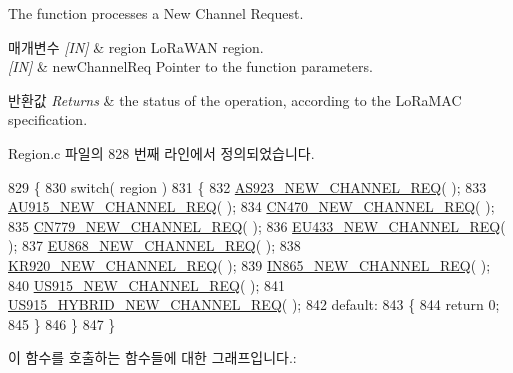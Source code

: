 The function processes a New Channel Request. 


\begin{DoxyParams}{매개변수}
{\em \mbox{[}\+I\+N\mbox{]}} & region Lo\+Ra\+W\+AN region.\\
\hline
{\em \mbox{[}\+I\+N\mbox{]}} & new\+Channel\+Req Pointer to the function parameters.\\
\hline
\end{DoxyParams}

\begin{DoxyRetVals}{반환값}
{\em Returns} & the status of the operation, according to the Lo\+Ra\+M\+AC specification. \\
\hline
\end{DoxyRetVals}


Region.\+c 파일의 828 번째 라인에서 정의되었습니다.


\begin{DoxyCode}
829 \{
830     \textcolor{keywordflow}{switch}( region )
831     \{
832         \mbox{\hyperlink{_region_8c_a1ef9f8348eba42a05df97ad9f44cd320}{AS923\_NEW\_CHANNEL\_REQ}}( );
833         \mbox{\hyperlink{_region_8c_ac804a38748d50ef58f3a9de969eb8943}{AU915\_NEW\_CHANNEL\_REQ}}( );
834         \mbox{\hyperlink{_region_8c_adf06e4f758d87411422845db6d17caba}{CN470\_NEW\_CHANNEL\_REQ}}( );
835         \mbox{\hyperlink{_region_8c_adf4be8140da6914b2167672060f71fc2}{CN779\_NEW\_CHANNEL\_REQ}}( );
836         \mbox{\hyperlink{_region_8c_a2d68e75fcb440f3710dd64d004839b65}{EU433\_NEW\_CHANNEL\_REQ}}( );
837         \mbox{\hyperlink{_region_8c_a9a4ae4f377ca4c9bc30e5c6977cf2e52}{EU868\_NEW\_CHANNEL\_REQ}}( );
838         \mbox{\hyperlink{_region_8c_a32839b5a09ae3d434672da7db727cb35}{KR920\_NEW\_CHANNEL\_REQ}}( );
839         \mbox{\hyperlink{_region_8c_a09b1a48bfc5be8eff2d59141469957c5}{IN865\_NEW\_CHANNEL\_REQ}}( );
840         \mbox{\hyperlink{_region_8c_a554e49c74e3a7f31e706f2e0553b4b45}{US915\_NEW\_CHANNEL\_REQ}}( );
841         \mbox{\hyperlink{_region_8c_a8f83e0b3f55bd62389b83eafb0070229}{US915\_HYBRID\_NEW\_CHANNEL\_REQ}}( );
842         \textcolor{keywordflow}{default}:
843         \{
844             \textcolor{keywordflow}{return} 0;
845         \}
846     \}
847 \}
\end{DoxyCode}
이 함수를 호출하는 함수들에 대한 그래프입니다.\+:
\mbox{\label{group___r_e_g_i_o_n_ga627b895f8bdd552639820ddfcfaa698e}} 
